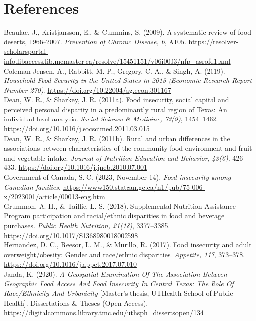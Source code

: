 \documentclass[
]{article}
\begin{document}
\section{References}\label{references}

Beaulac, J., Kristjansson, E., \& Cummins, S. (2009). A systematic
review of food deserts, 1966--2007. \emph{Prevention of Chronic Disease,
6}, A105.
\url{https://resolver-scholarsportal-info.libaccess.lib.mcmaster.ca/resolve/15451151/v06i0003/nfp_asrofd1.xml}\\
Coleman-Jensen, A., Rabbitt, M. P., Gregory, C. A., \& Singh, A. (2019).
\emph{Household Food Security in the United States in 2018 (Economic
Research Report Number 270)}.
\url{https://doi.org/10.22004/ag.econ.301167}\\
Dean, W. R., \& Sharkey, J. R. (2011a). Food insecurity, social capital
and perceived personal disparity in a predominantly rural region of
Texas: An individual-level analysis. \emph{Social Science \& Medicine,
72(9)}, 1454--1462.
\url{https://doi.org/10.1016/j.socscimed.2011.03.015}\\
Dean, W. R., \& Sharkey, J. R. (2011b). Rural and urban differences in
the associations between characteristics of the community food
environment and fruit and vegetable intake. \emph{Journal of Nutrition
Education and Behavior, 43(6)}, 426--433.
\url{https://doi.org/10.1016/j.jneb.2010.07.001}\\
Government of Canada, S. C. (2023, November 14). \emph{Food insecurity
among Canadian families}.
\url{https://www150.statcan.gc.ca/n1/pub/75-006-x/2023001/article/00013-eng.htm}\\
Grummon, A. H., \& Taillie, L. S. (2018). Supplemental Nutrition
Assistance Program participation and racial/ethnic disparities in food
and beverage purchases. \emph{Public Health Nutrition, 21(18)},
3377--3385. \url{https://doi.org/10.1017/S1368980018002598}\\
Hernandez, D. C., Reesor, L. M., \& Murillo, R. (2017). Food insecurity
and adult overweight/obesity: Gender and race/ethnic disparities.
\emph{Appetite, 117}, 373--378.
\url{https://doi.org/10.1016/j.appet.2017.07.010}\\
Janda, K. (2020). \emph{A Geospatial Examination Of The Association
Between Geographic Food Access And Food Insecurity In Central Texas: The
Role Of Race/Ethnicity And Urbanicity} {[}Master's thesis, UTHealth
School of Public Health{]}. Dissertations \& Theses (Open Access).
\url{https://digitalcommons.library.tmc.edu/uthsph_dissertsopen/134}\\
\end{document}

